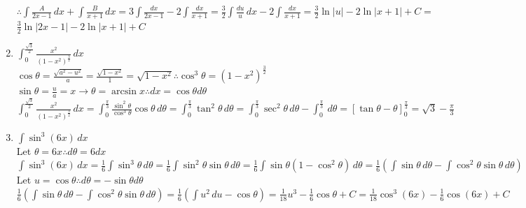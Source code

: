 \documentclass[10pt, letterpaper]{report}
\begin{document}
\begin{enumerate}
    $\therefore \int{\frac{A}{2x-1}}\,dx+\int{\frac{B}{x+1}}\,dx=
    3\int{\frac{dx}{2x-1}}-2\int{\frac{dx}{x+1}}=
    \frac{3}{2}\int{\frac{du}{u}}\,dx-2\int{\frac{dx}{x+1}}=
    \frac{3}{2}\ln{|u|}-2\ln{|x+1|}+C=$ \\
    
    $\frac{3}{2}\ln{|2x-1|}-2\ln{|x+1|}+C$ \\
    
  \item{$\int_{0}^{\frac{\sqrt{3}}{2}}{\frac{x^{2}}{\left(1-x^{2}\right)^{\frac{3}{2}}}}\,dx$} \\
  
    $\cos{\theta}=\frac{\sqrt{a^{2}-u^{2}}}{a}=\frac{\sqrt{1-x^{2}}}{1}=\sqrt{1-x^{2}}\therefore \cos^{3}{\theta}=\left(1-x^{2}\right)^{\frac{3}{2}}$ \\
    
    $\sin{\theta}=\frac{u}{a}=x\rightarrow \theta=\arcsin{x}\therefore dx=\cos{\theta}d\theta$ \\
    
    $\int_{0}^{\frac{\sqrt{3}}{2}}{\frac{x^{2}}{\left(1-x^{2}\right)^{\frac{3}{2}}}}\,dx=
    \int_{0}^{\frac{\pi}{3}}{\frac{\sin^{2}{\theta}}{\cos^{3}{\theta}}\cos{\theta}}\,d\theta=
    \int_{0}^{\frac{\pi}{3}}{\tan^{2}{\theta}}\,d\theta=
    \int_{0}^{\frac{\pi}{3}}{\sec^{2}{\theta}}\,d\theta-\int_{0}^{\frac{\pi}{3}}{}\,d\theta=
    [\tan{\theta}-\theta]_{0}^{\frac{\pi}{3}}=
    \sqrt{3}-\frac{\pi}{3}$ \\
    \pagebreak 
    
  \item{$\int{\sin^{3}{(6x)}}\,dx$} \\
  
    Let $\theta=6x\therefore d\theta=6dx$ \\
    
    $\int{\sin^{3}{(6x)}}\,dx=
    \frac{1}{6}\int{\sin^{3}{\theta}}\,d\theta=
    \frac{1}{6}\int{\sin^{2}{\theta}\sin{\theta}}\,d\theta=
    \frac{1}{6}\int{\sin{\theta}\left(1-\cos^{2}{\theta}\right)}\,d\theta=
    \frac{1}{6}\left(\int{\sin{\theta}}\,d\theta-\int{\cos^{2}{\theta}\sin{\theta}\,d\theta}\right)$ \\
    
    Let $u=\cos{\theta}\therefore d\theta=-\sin{\theta}d\theta$ \\
    
    $\frac{1}{6}\left(\int{\sin{\theta}}\,d\theta-\int{\cos^{2}{\theta}\sin{\theta}\,d\theta}\right)=
    \frac{1}{6}\left(\int{u^{2}}\,du-\cos{\theta}\right)=
    \frac{1}{18}u^{3}-\frac{1}{6}\cos{\theta}+C=
    \frac{1}{18}\cos^{3}{(6x)}-\frac{1}{6}\cos{(6x)}+C$ \\
    

\end{enumerate}
\end{document}
